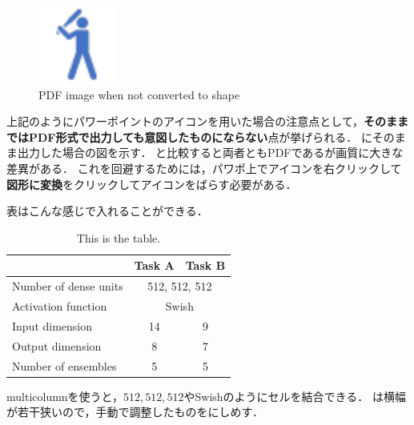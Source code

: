 \begin{figure}[t]
    \centering
    \includegraphics[clip, width=0.3\linewidth]{figures/hit.pdf}
    \caption{PDF image when not converted to shape}
    \label{fig: unconverted_pdf}
\end{figure}


上記のようにパワーポイントのアイコンを用いた場合の注意点として，\textbf{そのままではPDF形式で出力しても意図したものにならない}点が挙げられる．
にそのまま出力した場合の図を示す．
と比較すると両者ともPDFであるが画質に大きな差異がある．
これを回避するためには，パワポ上でアイコンを右クリックして\textbf{図形に変換}をクリックしてアイコンをばらす必要がある．

\newpage

表はこんな感じで入れることができる．

\begin{table}[t]
    \centering
    \begin{tabular}{l|cc}
        \toprule
                                & \textbf{Task A} & \textbf{Task B}  \\
        \midrule
        Number of dense units   & \multicolumn{2}{c}{512, 512, 512} \\
        Activation function     & \multicolumn{2}{c}{Swish} \\
        Input dimension         & 14 & 9 \\
        Output dimension        & 8  & 7 \\
        Number of ensembles     & 5  & 5 \\
        \bottomrule
    \end{tabular}
    \caption{This is the table.}
    \label{tab: sample}
\end{table}

multicolumnを使うと，$512, 512, 512$やSwishのようにセルを結合できる．
は横幅が若干狭いので，手動で調整したものをにしめす．

